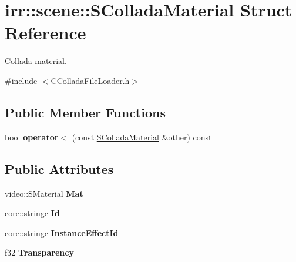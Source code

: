 \hypertarget{structirr_1_1scene_1_1_s_collada_material}{\section{irr\-:\-:scene\-:\-:S\-Collada\-Material Struct Reference}
\label{structirr_1_1scene_1_1_s_collada_material}
}


Collada material.  




{\ttfamily \#include $<$C\-Collada\-File\-Loader.\-h$>$}

\subsection*{Public Member Functions}
\begin{DoxyCompactItemize}
\item 
\hypertarget{structirr_1_1scene_1_1_s_collada_material_a9e4943ae2d330c1440bbf438838a2deb}{bool {\bfseries operator$<$} (const \hyperlink{structirr_1_1scene_1_1_s_collada_material}{S\-Collada\-Material} \&other) const }\label{structirr_1_1scene_1_1_s_collada_material_a9e4943ae2d330c1440bbf438838a2deb}

\end{DoxyCompactItemize}
\subsection*{Public Attributes}
\begin{DoxyCompactItemize}
\item 
\hypertarget{structirr_1_1scene_1_1_s_collada_material_ab4a228c6ddbf767dc5264c68ae29153d}{video\-::\-S\-Material {\bfseries Mat}}\label{structirr_1_1scene_1_1_s_collada_material_ab4a228c6ddbf767dc5264c68ae29153d}

\item 
\hypertarget{structirr_1_1scene_1_1_s_collada_material_a20ecf1443eeece0ad6c8e5c3a5dbaf95}{core\-::stringc {\bfseries Id}}\label{structirr_1_1scene_1_1_s_collada_material_a20ecf1443eeece0ad6c8e5c3a5dbaf95}

\item 
\hypertarget{structirr_1_1scene_1_1_s_collada_material_afef9b52382578b84a91268e22b913dfa}{core\-::stringc {\bfseries Instance\-Effect\-Id}}\label{structirr_1_1scene_1_1_s_collada_material_afef9b52382578b84a91268e22b913dfa}

\item 
\hypertarget{structirr_1_1scene_1_1_s_collada_material_aaf13236b82f1981bc602a2ff64651f9d}{f32 {\bfseries Transparency}}\label{structirr_1_1scene_1_1_s_collada_material_aaf13236b82f1981bc602a2ff64651f9d}

\end{DoxyCompactItemize}


